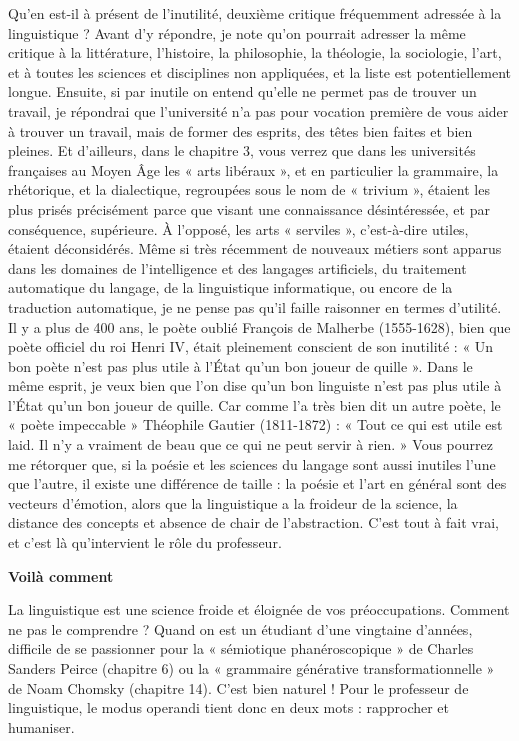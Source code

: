 Qu’en est-il à présent de l’inutilité, deuxième critique fréquemment adressée à la linguistique ? Avant d’y répondre, je note qu’on pourrait adresser la même critique à la littérature, l’histoire, la philosophie, la théologie, la sociologie, l’art, et à toutes les sciences et disciplines non appliquées, et la liste est potentiellement longue. Ensuite, si par inutile on entend qu’elle ne permet pas de trouver un travail, je répondrai que l’université n’a pas pour vocation première de vous aider à trouver un travail, mais de former des esprits, des têtes bien faites et bien pleines. Et d’ailleurs, dans le chapitre 3, vous verrez que dans les universités françaises au Moyen Âge les « arts libéraux », et en particulier la grammaire, la rhétorique, et la dialectique, regroupées sous le nom de « trivium », étaient les plus prisés précisément parce que visant une connaissance désintéressée, et par conséquence, supérieure. À l’opposé, les arts « serviles », c’est-à-dire utiles, étaient déconsidérés. Même si très récemment de nouveaux métiers sont apparus dans les domaines de l’intelligence et des langages artificiels, du traitement automatique du langage, de la linguistique informatique, ou encore de la traduction automatique, je ne pense pas qu’il faille raisonner en termes d’utilité. Il y a plus de 400 ans, le poète oublié François de Malherbe (1555-1628), bien que poète officiel du roi Henri IV, était pleinement conscient de son inutilité : « Un bon poète n’est pas plus utile à l’État qu’un bon joueur de quille ». Dans le même esprit, je veux bien que l’on dise qu’un bon linguiste n’est pas plus utile à l’État qu’un bon joueur de quille. Car comme l’a très bien dit un autre poète, le « poète impeccable » Théophile Gautier (1811-1872) : « Tout ce qui est utile est laid. Il n’y a vraiment de beau que ce qui ne peut servir à rien. » Vous pourrez me rétorquer que, si la poésie et les sciences du langage sont aussi inutiles l’une que l’autre, il existe une différence de taille : la poésie et l’art en général sont des vecteurs d’émotion, alors que la linguistique a la froideur de la science, la distance des concepts et absence de chair de l’abstraction. C’est tout à fait vrai, et c’est là qu’intervient le rôle du professeur.

\begin{center}\bfseries Voilà comment\end{center}
La linguistique est une science froide et éloignée de vos préoccupations. Comment ne pas le comprendre ? Quand on est un étudiant d’une vingtaine d’années, difficile de se passionner pour la « sémiotique phanéroscopique » de Charles Sanders Peirce (chapitre 6) ou la « grammaire générative transformationnelle » de Noam Chomsky (chapitre 14). C’est bien naturel ! Pour le professeur de linguistique, le modus operandi tient donc en deux mots : rapprocher et humaniser.

